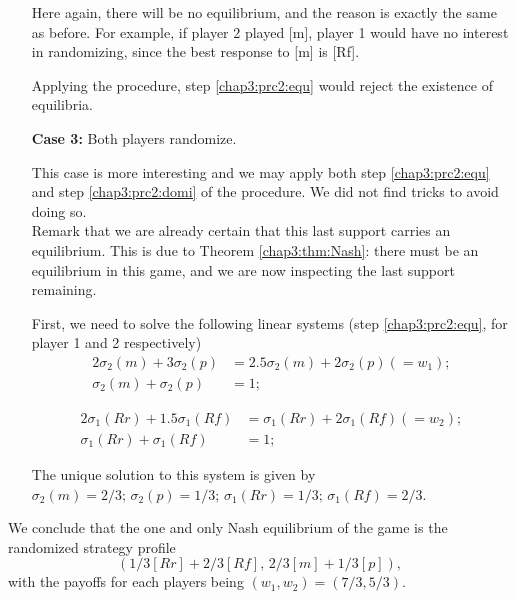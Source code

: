 \begin{example}
\begin{itemize}
Here again, there will be no equilibrium, and the reason is exactly the same as before.
For example, if player 2 played [m], player 1 would have no interest in randomizing, since the best response to [m] is [Rf]. 

Applying the procedure, step \ref{chap3:prc2:equ} would reject the existence of equilibria.

\item[\textbf{Case 3:}] Both players randomize.

This case is more interesting and we may apply both step \ref{chap3:prc2:equ} and step \ref{chap3:prc2:domi} of the procedure. We did not find tricks to avoid doing so.\\
Remark that we are already certain that this last support carries an equilibrium. This is due to Theorem \ref{chap3:thm:Nash}: there must be an equilibrium in this game, and we are now inspecting the last support remaining.

First, we need to solve the following linear systems (step \ref{chap3:prc2:equ}, for player 1 and 2 respectively)
\begin{equation}
\begin{aligned}
 2 \sigma_2(m) + 3 \sigma_2(p) & = 2.5 \sigma_2(m) + 2 \sigma_2(p) (= w_1); \\
 \sigma_2(m) + \sigma_2(p) & = 1;
\end{aligned}
\end{equation}

\begin{equation}
\begin{aligned}
2 \sigma_1(Rr) + 1.5 \sigma_1(Rf) & = \sigma_1(Rr) + 2 \sigma_1(Rf) (=w_2); \\
\sigma_1(Rr) + \sigma_1(Rf)&  = 1;
\end{aligned}
\end{equation}

The unique solution to this system is given by $\sigma_2(m) = 2/3; \, \sigma_2(p) = 1/3; \, \sigma_1(Rr) = 1/3; \, \sigma_1(Rf) = 2/3$. 
\end{itemize}
We conclude that the one and only Nash equilibrium of the game is the randomized strategy profile 
$$(1/3 [Rr] + 2/3 [Rf], \, 2/3 [m] + 1/3 [p]), $$
with the payoffs for each players being $(w_1, w_2) = (7/3, 5/3). $

\label{chap3:ex:cardgame}
\end{example}


